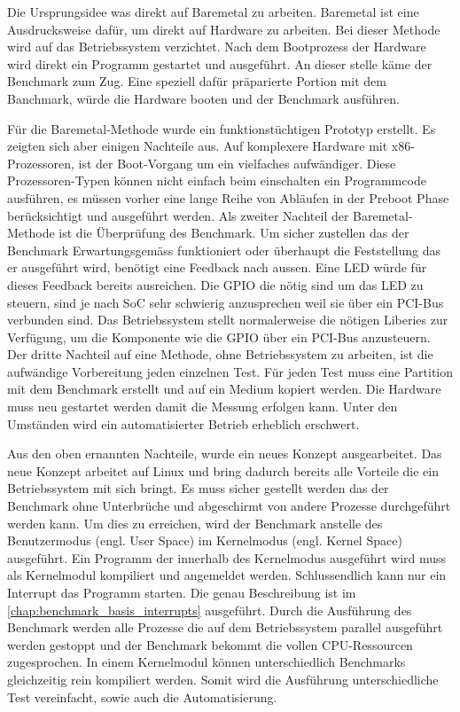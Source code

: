 \par
Die Ursprungsidee was direkt auf Baremetal zu arbeiten. Baremetal ist eine Ausdrucksweise dafür, um direkt auf Hardware zu arbeiten. Bei dieser Methode wird auf das Betriebssystem verzichtet. Nach dem Bootprozess der Hardware wird direkt ein Programm gestartet und ausgeführt. An dieser stelle käme der Benchmark zum Zug. Eine speziell dafür präparierte Portion mit dem Banchmark, würde die Hardware booten und der Benchmark ausführen.
\par
Für die Baremetal-Methode wurde ein funktionstüchtigen Prototyp erstellt. Es zeigten sich aber einigen Nachteile aus. Auf komplexere Hardware mit x86-Prozessoren, ist der Boot-Vorgang um ein vielfaches aufwändiger\cite{intel_boot_process}. Diese Prozessoren-Typen können nicht einfach beim einschalten ein Programmcode ausführen, es müssen vorher eine lange Reihe von Abläufen in der Preboot Phase berücksichtigt und ausgeführt werden. Als zweiter Nachteil der Baremetal-Methode ist die Überprüfung des Benchmark. Um sicher zustellen das der Benchmark Erwartungsgemäss funktioniert oder überhaupt die Feststellung das er ausgeführt wird, benötigt eine Feedback nach aussen. Eine LED würde für dieses Feedback bereits ausreichen. Die GPIO die nötig sind um das LED zu steuern, sind je nach SoC sehr schwierig anzusprechen weil sie über ein PCI-Bus verbunden sind. Das Betriebssystem stellt normalerweise die nötigen Liberies zur Verfügung, um die Komponente wie die GPIO über ein PCI-Bus anzusteuern. Der dritte Nachteil auf eine Methode, ohne Betriebssystem zu arbeiten, ist die aufwändige Vorbereitung jeden einzelnen Test. Für jeden Test muss eine Partition mit dem Benchmark erstellt und auf ein Medium kopiert werden. Die Hardware muss neu gestartet werden
damit die Messung erfolgen kann. Unter den Umständen wird ein automatisierter Betrieb erheblich erschwert.
\par
Aus den oben ernannten Nachteile, wurde ein neues Konzept ausgearbeitet. Das neue Konzept arbeitet auf Linux und bring dadurch bereits alle Vorteile die ein Betriebssystem mit sich bringt. Es muss sicher gestellt werden das der Benchmark ohne Unterbrüche und abgeschirmt von andere Prozesse durchgeführt werden kann. Um dies zu erreichen, wird der Benchmark anstelle des Benutzermodus (engl. User Space) im Kernelmodus (engl. Kernel Space) ausgeführt. Ein Programm der innerhalb des Kernelmodus ausgeführt wird muss als Kernelmodul kompiliert und angemeldet werden. Schlussendlich kann nur ein Interrupt das Programm starten. Die genau Beschreibung ist im \autoref{chap:benchmark_basis_interrupts} ausgeführt. Durch die Ausführung des Benchmark werden alle Prozesse die auf dem Betriebssystem parallel ausgeführt werden gestoppt und der Benchmark bekommt die vollen CPU-Ressourcen zugesprochen. In einem Kernelmodul können unterschiedlich Benchmarks gleichzeitig rein kompiliert werden. Somit wird die Ausführung unterschiedliche Test vereinfacht, sowie auch die Automatisierung.

 



 